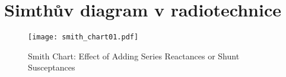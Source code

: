 \chapter{Simthův diagram v radiotechnice}\label{chap:ra_smith}
\minitoc

    \begin{figure}[ht!]  %
      \centering
      \texttt{[image: smith\_chart01.pdf]}
      \caption{Smith Chart: Effect of Adding Series Reactances or Shunt Susceptances 
               \cite[s.~45]{IEEEStearns2001}}
      \label{fig_RA:smith01}
    \end{figure}
    
\printbibliography[heading=subbibliography]
